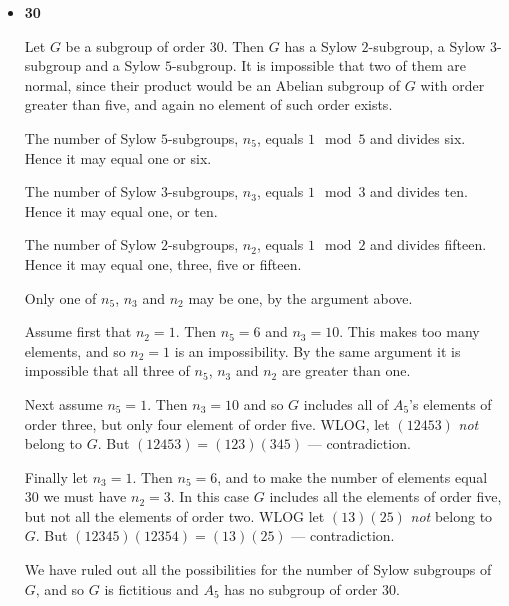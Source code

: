 \documentclass[11pt]{article} \usepackage{amssymb}
\begin{document}
\begin{enumerate}
\begin{itemize}
    \item {\bf 30}

      Let $G$ be a subgroup of order 30. Then $G$ has a Sylow 
      $2$-subgroup, a Sylow $3$-subgroup and a Sylow $5$-subgroup. 
      It is impossible that two of them are normal, since their
      product would be an Abelian subgroup of $G$ with order 
      greater than five, and again no element of such order exists.

      The number of Sylow $5$-subgroups, $n_5$, equals $1\mod 5$ and 
      divides six. Hence it may equal one or six.

      The number of Sylow $3$-subgroups, $n_3$, equals $1\mod 3$ and 
      divides ten. Hence it may equal one, or ten.

      The number of Sylow $2$-subgroups, $n_2$, equals $1\mod 2$ and 
      divides fifteen. Hence it may equal one, three, five or fifteen.

      Only one of $n_5$, $n_3$ and $n_2$ may be one, by the argument above.

      Assume first that $n_2=1$. Then $n_5=6$ and $n_3=10$. This makes too 
      many elements, and so $n_2=1$ is an impossibility. By the same argument
      it is impossible that all three of $n_5$, $n_3$ and $n_2$ are greater 
      than one.

      Next assume $n_5=1$. Then $n_3=10$ and so $G$ includes all of $A_5$'s 
      elements of order three, but only four element of order five. WLOG,
      let $(12453)$ {\em not} belong to $G$. But $(12453)=(123)(345)$ --- contradiction.

      Finally let $n_3=1$. Then $n_5=6$, and to make the number of elements
      equal 30 we must have $n_2=3$. In this case $G$ includes all the elements
      of order five, but not all the elements of order two. WLOG let 
      $(13)(25)$ {\em not} belong to $G$. But $(12345)(12354)=(13)(25)$ ---
      contradiction. 

      We have ruled out all the possibilities for the number of Sylow subgroups
      of $G$, and so $G$ is fictitious and $A_5$ has no subgroup of order 30.
    \end{itemize}
\end{enumerate}
\end{document}
